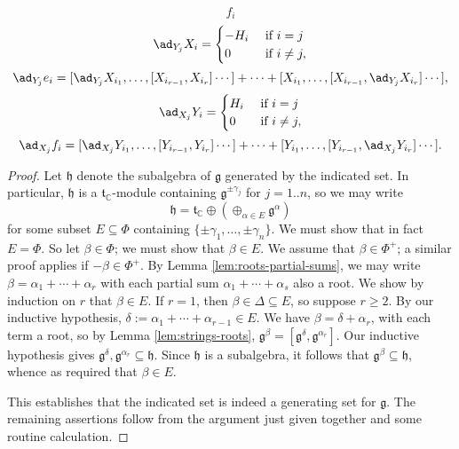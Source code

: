 \documentclass[reqno]{amsart} 
\begin{document}
\begin{corollary}
\begin{equation}
    f_i
  \end{equation}
  \begin{equation}\label{eqn:}
    \ad_{Y_j} X_i
    =
    \begin{cases}
      - H_i & \text{ if }i = j \\
      0 & \text{ if } i \neq j,
    \end{cases}
  \end{equation}
  \begin{equation}\label{eqn:}
    \ad_{Y_j} e_i
    =
    [\ad_{Y_j} X_{i_1},\dotsc,[X_{i_{r-1}}, X_{i_r}]\dotsb]
    + \dotsb
    +
    [ X_{i_1},\dotsc,[X_{i_{r-1}}, \ad_{Y_j} X_{i_r}]\dotsb],
  \end{equation}
  \begin{equation}\label{eqn:}
    \ad_{X_j} Y_i
    =
    \begin{cases}
      H_i & \text{ if }i = j \\
      0 & \text{ if } i \neq j,
    \end{cases}
  \end{equation}
  \begin{equation}\label{eqn:}
    \ad_{X_j} f_i
    =
    [\ad_{X_j} Y_{i_1},\dotsc,[Y_{i_{r-1}}, Y_{i_r}]\dotsb]
    + \dotsb
    +
    [ Y_{i_1},\dotsc,[Y_{i_{r-1}}, \ad_{X_j} Y_{i_r}]\dotsb].
  \end{equation}
\end{corollary}
\begin{proof}
  Let $\mathfrak{h}$ denote the subalgebra of $\mathfrak{g}$ generated by the indicated set.  In particular, $\mathfrak{h}$ is a $\mathfrak{t}_{\mathbb{C}}$-module containing $\mathfrak{g}^{\pm \gamma_j}$ for $j=1..n$, so we may write
  \begin{equation*}
    \mathfrak{h} = \mathfrak{t}_{\mathbb{C}} \oplus (\oplus_{\alpha \in E} \mathfrak{g}^{\alpha})
  \end{equation*}
  for some subset $E \subseteq \Phi$ containing $\{\pm \gamma_1, \dotsc, \pm \gamma_n\}$.  We must show that in fact $E = \Phi$.  So let $\beta \in \Phi$; we must show that $\beta \in E$.  We assume that $\beta \in \Phi^+$; a similar proof applies if $- \beta \in \Phi^+$.  By Lemma \ref{lem:roots-partial-sums}, we may write $\beta = \alpha_1 + \dotsb + \alpha_r$ with each partial sum $\alpha_1 + \dotsb + \alpha_s$ also a root.  We show by induction on $r$ that $\beta \in E$.  If $r = 1$, then $\beta \in \Delta \subseteq E$, so suppose $r \geq 2$.  By our inductive hypothesis, $\delta := \alpha_1 + \dotsb + \alpha_{r-1} \in E$.  We have $\beta = \delta + \alpha_r$, with each term a root, so by Lemma \ref{lem:strings-roots}, $\mathfrak{g}^{\beta} = [\mathfrak{g}^\delta, \mathfrak{g}^{\alpha_r}]$.  Our inductive hypothesis gives $\mathfrak{g}^\delta, \mathfrak{g}^{\alpha_r} \subseteq \mathfrak{h}$.  Since $\mathfrak{h}$ is a subalgebra, it follows that $\mathfrak{g}^{\beta} \subseteq \mathfrak{h}$, whence as required that $\beta \in E$.

  This establishes that the indicated set is indeed a generating set for $\mathfrak{g}$.  The remaining assertions follow from the argument just given together and some routine calculation.
\end{proof}
\end{document}
